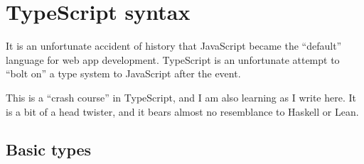 \documentclass[11pt,a4paper]{article}
\begin{document}
\newpage

\section{TypeScript syntax}
\label{sec:ts}

\begin{sectionbox}
It is an unfortunate accident of history that JavaScript became the ``default'' language for web
app development. TypeScript is an unfortunate attempt to ``bolt on'' a type system to JavaScript
after the event.

This is a ``crash course'' in TypeScript, and I am also learning as I write here. It is a bit of a
head twister, and it bears almost no resemblance to Haskell or Lean.
\end{sectionbox}

\subsection{Basic types}
\label{sec:tssyntax}
\end{document}
